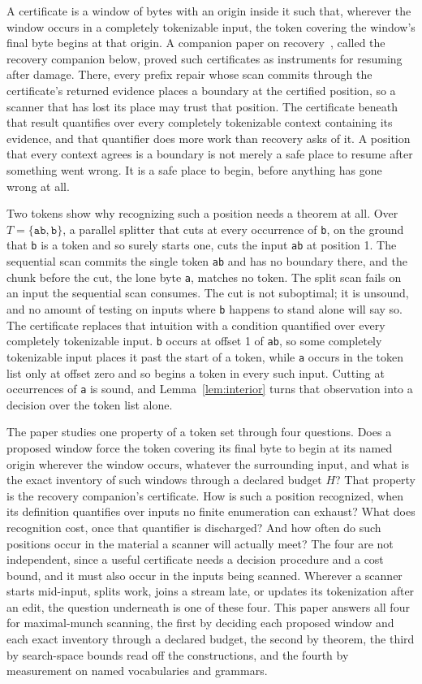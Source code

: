 \documentclass[11pt,a4paper]{article}
\theoremstyle{definition}
\theoremstyle{plain}
\newcommand{\code}[1]{\texttt{#1}}
\begin{document}
A certificate is a window of bytes with an origin inside it such that, wherever the window occurs in a completely
tokenizable input, the token covering the window's final byte begins at that origin. A companion paper on
recovery~\citep{nidhogg2026panicmode}, called the recovery companion below, proved such certificates as instruments for
resuming after damage. There, every prefix repair whose scan commits through the certificate's returned evidence places
a boundary at the certified position, so a scanner that has lost its place may trust that position. The certificate
beneath that result quantifies over every completely tokenizable context containing its evidence, and that quantifier
does more work than recovery asks of it. A position that every context agrees is a boundary is not merely a safe place
to resume after something went wrong. It is a safe place to begin, before anything has gone wrong at all.

Two tokens show why recognizing such a position needs a theorem at all. Over $T = \{\code{ab}, \code{b}\}$, a parallel
splitter that cuts at every occurrence of \code{b}, on the ground that \code{b} is a token and so surely starts one,
cuts the input \code{ab} at position 1. The sequential scan commits the single token \code{ab} and has no boundary
there, and the chunk before the cut, the lone byte \code{a}, matches no token. The split scan fails on an input the
sequential scan consumes. The cut is not suboptimal; it is unsound, and no amount of testing on inputs where \code{b}
happens to stand alone will say so. The certificate replaces that intuition with a condition quantified over every
completely tokenizable input. \code{b} occurs at offset 1 of \code{ab}, so some completely tokenizable input places it
past the start of a token, while \code{a} occurs in the token list only at offset zero and so begins a token in every
such input. Cutting at occurrences of \code{a} is sound, and Lemma~\ref{lem:interior} turns that observation into a
decision over the token list alone.

The paper studies one property of a token set through four questions. Does a proposed window force the token covering
its final byte to begin at its named origin wherever the window occurs, whatever the surrounding input, and what is the
exact inventory of such windows through a declared budget $H$? That property is the recovery companion's certificate.
How is such a position recognized, when its definition quantifies over inputs no finite enumeration can exhaust? What
does recognition cost, once that quantifier is discharged? And how often do such positions occur in the material a
scanner will actually meet? The four are not independent, since a useful certificate needs a decision procedure and a
cost bound, and it must also occur in the inputs being scanned. Wherever a scanner starts mid-input, splits work, joins
a stream late, or updates its tokenization after an edit, the question underneath is one of these four. This paper
answers all four for maximal-munch scanning, the first by deciding each proposed window and each exact inventory through
a declared budget, the second by theorem, the third by search-space bounds read off the constructions, and the fourth by
measurement on named vocabularies and grammars.
\end{document}
